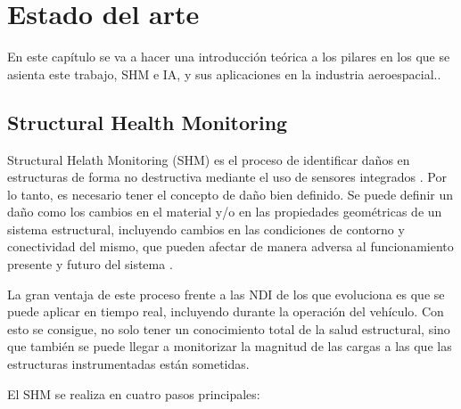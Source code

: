 \chapter{Estado del arte}

En este capítulo se va a hacer una introducción teórica a los pilares en los que se asienta este trabajo, SHM e IA, y sus aplicaciones en la industria aeroespacial.. 

\section{Structural Health Monitoring}

Structural Helath Monitoring (SHM) es el proceso de identificar daños en estructuras de forma no destructiva mediante el uso de sensores integrados \cite{SHM_Aero_3}. Por lo tanto, es necesario tener el concepto de daño bien definido. Se puede definir un daño como los cambios en el material y/o en las propiedades geométricas de un sistema estructural, incluyendo cambios en las condiciones de contorno y conectividad del mismo, que pueden afectar de manera adversa al funcionamiento presente y futuro del sistema \cite{dam}. 

La gran ventaja de este proceso frente a las NDI de los que evoluciona es que se puede aplicar en tiempo real, incluyendo durante la operación del vehículo. Con esto se consigue, no solo tener un conocimiento total de la salud estructural, sino que también se puede llegar a monitorizar la magnitud de las cargas a las que las estructuras instrumentadas están sometidas.


El SHM se realiza en cuatro pasos principales:\\

